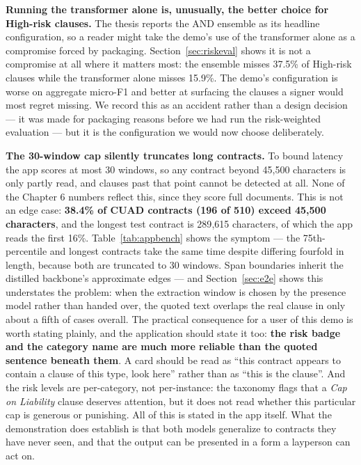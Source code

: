 \textbf{Running the transformer alone is, unusually, the better choice for High-risk clauses.} The thesis reports the AND ensemble as its headline configuration, so a reader might take the demo's use of the transformer alone as a compromise forced by packaging. Section~\ref{sec:riskeval} shows it is not a compromise at all where it matters most: the ensemble misses 37.5\% of High-risk clauses while the transformer alone misses 15.9\%. The demo's configuration is worse on aggregate micro-F1 and better at surfacing the clauses a signer would most regret missing. We record this as an accident rather than a design decision --- it was made for packaging reasons before we had run the risk-weighted evaluation --- but it is the configuration we would now choose deliberately.

\textbf{The 30-window cap silently truncates long contracts.} To bound latency the app scores at most 30 windows, so any contract beyond 45{,}500 characters is only partly read, and clauses past that point cannot be detected at all. None of the Chapter 6 numbers reflect this, since they score full documents. This is not an edge case: \textbf{38.4\% of CUAD contracts (196 of 510) exceed 45{,}500 characters}, and the longest test contract is 289{,}615 characters, of which the app reads the first 16\%. Table~\ref{tab:appbench} shows the symptom --- the 75th-percentile and longest contracts take the same time despite differing fourfold in length, because both are truncated to 30 windows. Span boundaries inherit the distilled backbone's approximate edges --- and Section~\ref{sec:e2e} shows this understates the problem: when the extraction window is chosen by the presence model rather than handed over, the quoted text overlaps the real clause in only about a fifth of cases overall. The practical consequence for a user of this demo is worth stating plainly, and the application should state it too: \textbf{the risk badge and the category name are much more reliable than the quoted sentence beneath them}. A card should be read as ``this contract appears to contain a clause of this type, look here'' rather than as ``this is the clause''. And the risk levels are per-category, not per-instance: the taxonomy flags that a \emph{Cap on Liability} clause deserves attention, but it does not read whether this particular cap is generous or punishing. All of this is stated in the app itself. What the demonstration does establish is that both models generalize to contracts they have never seen, and that the output can be presented in a form a layperson can act on.
